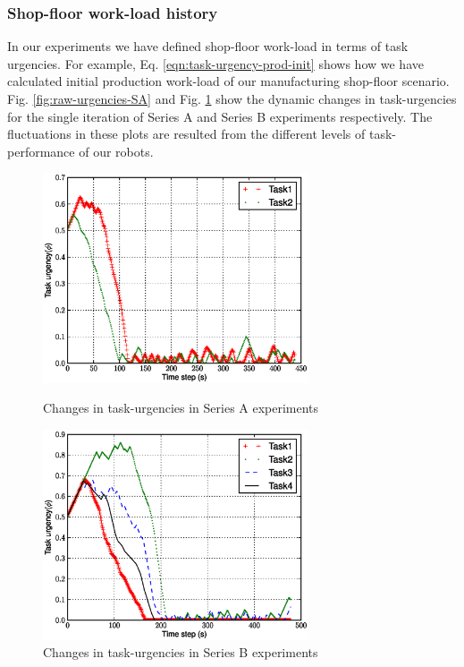 \documentclass[smallcondensed]{svjour3}
\begin{document}
\subsubsection{Shop-floor work-load history}
In our experiments we have defined shop-floor work-load in terms of task urgencies. For example, Eq. \ref{eqn:task-urgency-prod-init} shows how we have calculated initial production work-load of our manufacturing shop-floor scenario. Fig. \ref{fig:raw-urgencies-SA} and Fig. \ref{fig:raw-urgencies-SB}  show the dynamic changes in task-urgencies for the single iteration of Series A and Series B experiments respectively. The fluctuations in these plots are resulted from the different levels of task-performance of our robots.
\begin{figure}
\centering
\includegraphics[width=0.7\textwidth, angle=0]
{images/global-8robots/PlotUrgencyLog-2010Apr30-095755.eps}
\caption{\small Changes in task-urgencies in Series A experiments}
\label{fig:raw-urgencies-SA} 
\centering
\includegraphics[width=0.7\textwidth, angle=0]{images/PlotUrgencyLog-2010May10-115549.eps}
\caption{\small Changes in task-urgencies in Series B experiments} 
\label{fig:raw-urgencies-SB} 
\end{figure}
\end{document}
